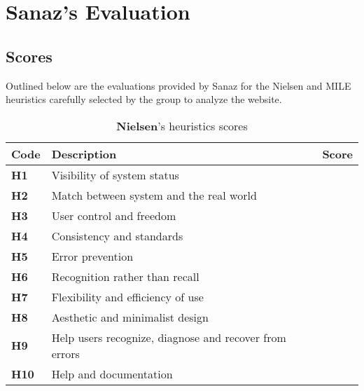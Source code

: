 \documentclass{article}
\begin{document}
\section{Sanaz's Evaluation}
\subsection{Scores}
Outlined below are the evaluations provided by Sanaz for the Nielsen and MILE heuristics carefully selected by the group to analyze the website.\\
\begin{table}[htp!]
    \centering
    \begin{tabular}{ |l|l|c| }
        \hline
        \textbf{Code} & \textbf{Description} & \textbf{Score}\\
        \hline
        \textbf{H1} & Visibility of system status & \textbf{\color{unicefOrange}{3}}\\
        \hline
        \textbf{H2} & Match between system and the real world & \textbf{\color{unicefGreen}{4}}\\
        \hline
        \textbf{H3} & User control and freedom & \textbf{\color{unicefOrange}{3}}\\
        \hline
        \textbf{H4} & Consistency and standards & \textbf{\color{unicefGreen}{4}}\\
        \hline
        \textbf{H5} & Error prevention & \textbf{\color{unicefGreen}{4.5}}\\
        \hline
        \textbf{H6} & Recognition rather than recall & \textbf{\color{unicefGreen}{4.5}}\\
        \hline
        \textbf{H7} & Flexibility and efficiency of use & \textbf{\color{unicefOrange}{3.5}}\\
        \hline
        \textbf{H8} & Aesthetic and minimalist design & \textbf{\color{unicefGreen}{4}}\\
        \hline
        \textbf{H9} & Help users recognize, diagnose and recover from errors & \textbf{\color{unicefGreen}{4.5}}\\
        \hline
        \textbf{H10} & Help and documentation & \textbf{\color{unicefGreen}{4}}\\
        \hline
    \end{tabular}
    \caption{\textbf{Nielsen}'s heuristics scores}
\end{table}
\end{document}
